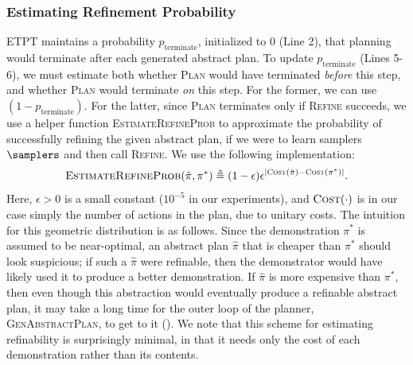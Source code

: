 \subsubsection{Estimating Refinement Probability}
\textsc{ETPT} maintains a probability $p_\text{terminate}$, initialized to $0$ (Line 2), that planning would terminate after each generated abstract plan.
To update $p_\text{terminate}$ (Lines 5-6), we must estimate both whether \textsc{Plan} would have terminated \emph{before} this step, and whether \textsc{Plan} would terminate \emph{on} this step.
For the former, we can use $(1 - p_\text{terminate})$.
For the latter, since \textsc{Plan} terminates only if \textsc{Refine} succeeds, we use a helper function \textsc{EstimateRefineProb} to approximate the probability of successfully refining the given abstract plan, if we were to learn samplers $\samplers$ and then call \textsc{Refine}.
We use the following implementation: $$\textsc{EstimateRefineProb}(\hat{\pi}, \pi^*) \triangleq (1 - \epsilon)\epsilon^{|\textsc{Cost}(\hat{\pi}) - \textsc{Cost}(\pi^*)|}.$$
Here, $\epsilon > 0$ is a small constant ($10^{-5}$ in our experiments), and $\textsc{Cost}(\cdot)$ is in our case simply the number of actions in the plan, due to unitary costs.
The intuition for this geometric distribution is as follows. Since the demonstration $\pi^*$ is assumed to be near-optimal, an abstract plan $\hat{\pi}$ that is cheaper than $\pi^*$ should look suspicious; if such a $\hat{\pi}$ were refinable, then the demonstrator would have likely used it to produce a better demonstration. If $\hat{\pi}$ is more expensive than $\pi^*$, then even though this abstraction would eventually produce a refinable abstract plan, it may take a long time for the outer loop of the planner, \textsc{GenAbstractPlan}, to get to it ().
We note that this scheme for estimating refinability is surprisingly minimal, in that it needs only the cost of each demonstration rather than its contents.

